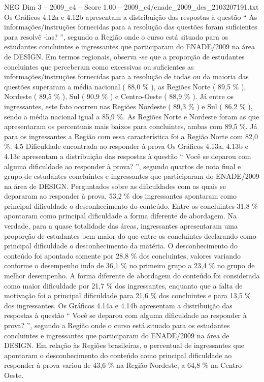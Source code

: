 \begin{textsample}{NEG Dim 3 – 2009\_c4 – Score 1.00 – 2009\_c4/enade\_2009\_des\_2103207191.txt}
Os Gráficos 4.12a e 4.12b apresentam a distribuição das respostas à questão “ As informações/instruções fornecidas para a resolução das questões foram suficientes para resolvê -las? ”, segundo a Região onde o curso está situado para os estudantes concluintes e ingressantes que participaram do ENADE/2009 na área de DESIGN.
Em termos regionais, observa -se que a proporção de estudantes concluintes que perceberam como excessivas ou suficientes as informações/instruções fornecidas para a resolução de todas ou da maioria das questões superaram a média nacional ( 88,0 \% ), as Regiões Norte ( 89,5 \% ), Nordeste ( 89,5 \% ), Sul ( 90,9 \% ) e Centro-Oeste ( 88,9 \% ).
Já entre os ingressantes, este fato ocorreu nas Regiões Nordeste ( 89,3 \% ) e Sul ( 86,2 \% ), sendo a média nacional igual a 85,9 \%.
As Regiões Norte e Nordeste foram as que apresentaram os percentuais mais baixos para concluintes, ambas com 89,5 \%.
Já para os ingressantes a Região com essa característica foi a Região Norte com 82,0 \%. 4.5 Dificuldade encontrada ao responder à prova Os Gráficos 4.13a, 4.13b e 4.13c apresentam a distribuição das respostas à questão “ Você se deparou com alguma dificuldade ao responder à prova? ”, segundo quartos de nota final e grupo de estudantes concluintes e ingressantes que participaram do ENADE/2009 na área de DESIGN.
Perguntados sobre as dificuldades com as quais se depararam ao responder à prova, 53,2 \% dos ingressantes apontaram como principal dificuldade o desconhecimento do conteúdo.
Entre os concluintes 31,8 \% apontaram como principal dificuldade a forma diferente de abordagem.
Na verdade, para a quase totalidade das áreas, ingressantes apresentaram uma proporção de estudantes bem maior do que entre os concluintes declarando como principal dificuldade o desconhecimento da matéria.
O desconhecimento do conteúdo foi apontado somente por 28,8 \% dos concluintes, valores variando conforme o desempenho indo de 36,1 \% no primeiro grupo a 23,4 \% no grupo de melhor desempenho.
A forma diferente de abordagem do conteúdo foi considerada como maior dificuldade por 21,7 \% dos ingressantes, enquanto que a falta de motivação foi a principal dificuldade para 21,6 \% dos concluintes e para 13,5 \% dos ingressantes.
Os Gráficos 4.14a e 4.14b apresentam a distribuição das respostas à questão “ Você se deparou com alguma dificuldade ao responder à prova? ”, segundo a Região onde o curso está situado para os estudantes concluintes e ingressantes que participaram do ENADE/2009 na área de DESIGN.
Em relação às Regiões brasileiras, o percentual de ingressantes que apontaram o desconhecimento do conteúdo como principal dificuldade ao responder à prova variou de 43,6 \% na Região Nordeste, a 64,8 \% na Centro-Oeste.

\end{textsample}

